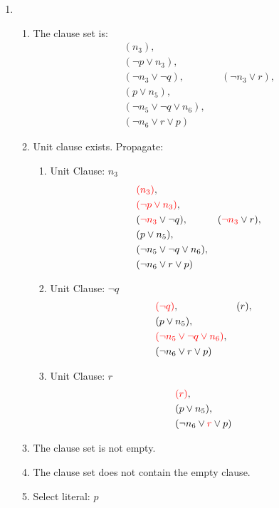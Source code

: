 \documentclass[11pt,a4paper]{article}
\begin{document}
\begin{enumerate}
\item 
\begin{enumerate}
\item The clause set is:
\begin{align*}
& (n_3), \\
& (\neg p \lor n_3), \\
& (\neg n_3 \lor \neg q) , &&  (\neg n_3 \lor r), \\
& ( p \lor n_5), \\
& (\neg n_5 \lor \neg q \lor n_6), \\
& (\neg n_6 \lor r \lor p)
\end{align*}
\item Unit clause exists. Propagate:
\begin{enumerate}
\item Unit Clause:  $n_3$
\begin{align*}
& \textcolor{red}{(n_3)}, \\
& \textcolor{red}{(\neg p \lor n_3)}, \\
& (\textcolor{red}{\neg n_3} \lor \neg q) , &&  (\textcolor{red}{\neg n_3} \lor r), \\
& ( p \lor n_5), \\
& (\neg n_5 \lor \neg q \lor n_6), \\
& (\neg n_6 \lor r \lor p)
\end{align*}
\item Unit Clause:  $\neg q$
\begin{align*}
& \textcolor{red}{(\neg q)} , &&  (r), \\
& ( p \lor n_5), \\
& \textcolor{red}{(\neg n_5 \lor \neg q \lor n_6)}, \\
& (\neg n_6 \lor r \lor p)
\end{align*}
\item Unit Clause:  $r$
\begin{align*}
& \textcolor{red}{(r)}, \\
& ( p \lor n_5), \\
& (\neg n_6 \lor \textcolor{red}{r} \lor p)
\end{align*}
\end{enumerate}
\item The clause set is not empty.
\item The clause set does not contain the empty clause.
\item Select literal: $p$
\end{enumerate}


\end{enumerate}
\end{document}
